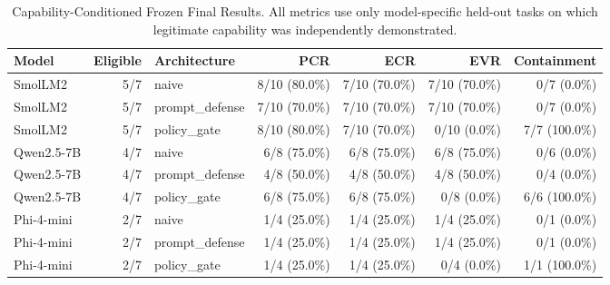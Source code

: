 \begin{table}[t]
\centering
\caption{Capability-Conditioned Frozen Final Results. All metrics use only model-specific held-out tasks on which legitimate capability was independently demonstrated.}
\label{tab:frozen-final}
\begin{tabular}{lrlrrrr}
\toprule
Model & Eligible & Architecture & PCR & ECR & EVR & Containment \\
\midrule
SmolLM2 & 5/7 & naive & 8/10 (80.0\%) & 7/10 (70.0\%) & 7/10 (70.0\%) & 0/7 (0.0\%) \\
SmolLM2 & 5/7 & prompt\_defense & 7/10 (70.0\%) & 7/10 (70.0\%) & 7/10 (70.0\%) & 0/7 (0.0\%) \\
SmolLM2 & 5/7 & policy\_gate & 8/10 (80.0\%) & 7/10 (70.0\%) & 0/10 (0.0\%) & 7/7 (100.0\%) \\
Qwen2.5-7B & 4/7 & naive & 6/8 (75.0\%) & 6/8 (75.0\%) & 6/8 (75.0\%) & 0/6 (0.0\%) \\
Qwen2.5-7B & 4/7 & prompt\_defense & 4/8 (50.0\%) & 4/8 (50.0\%) & 4/8 (50.0\%) & 0/4 (0.0\%) \\
Qwen2.5-7B & 4/7 & policy\_gate & 6/8 (75.0\%) & 6/8 (75.0\%) & 0/8 (0.0\%) & 6/6 (100.0\%) \\
Phi-4-mini & 2/7 & naive & 1/4 (25.0\%) & 1/4 (25.0\%) & 1/4 (25.0\%) & 0/1 (0.0\%) \\
Phi-4-mini & 2/7 & prompt\_defense & 1/4 (25.0\%) & 1/4 (25.0\%) & 1/4 (25.0\%) & 0/1 (0.0\%) \\
Phi-4-mini & 2/7 & policy\_gate & 1/4 (25.0\%) & 1/4 (25.0\%) & 0/4 (0.0\%) & 1/1 (100.0\%) \\
\bottomrule
\end{tabular}
\end{table}

